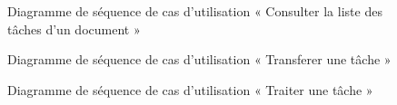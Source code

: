 \begin{figure}[H]
  \centering
  \caption{Diagramme de séquence de cas d'utilisation « Consulter la liste des tâches d'un document  »}
  \label{fig:sequence_previewTasks}
\end{figure}
\begin{figure}[H]
  \centering
  \caption{Diagramme de séquence de cas d'utilisation « Transferer une tâche  »}
  \label{fig:sequence_transfer_task}
\end{figure}
\begin{figure}[H]
  \centering
  \caption{Diagramme de séquence de cas d'utilisation « Traiter une tâche  »}
  \label{fig:sequence_traiter_task}
\end{figure}
